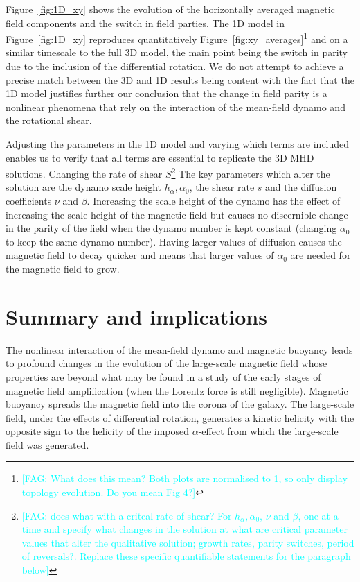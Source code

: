 \documentclass[fleqn,usenatbib]{mnras}
\newcommand{\fag}[1]{\textcolor{cyan}{[FAG: #1]}} %
\newcommand{\yq}[1]{\textcolor{PineGreen}{#1}} %
\begin{document}
Figure~\ref{fig:1D_xy} shows the evolution of the horizontally averaged
magnetic field components and the switch in field parties. The {1D} model in
Figure~\ref{fig:1D_xy} reproduces quantitatively
Figure~\ref{fig:xy_averages}\footnote{\fag{What does this mean? Both plots are
normalised to 1, so only display topology evolution. Do you mean Fig 4?}} and
on a similar timescale to the full {3D} model, the main point being the
switch in parity due to the inclusion of the differential rotation. We do not
attempt to achieve a precise match between the {3D} and {1D} results
being content with the fact that the {1D} model justifies further our
conclusion that the change in field parity is a nonlinear phenomena that rely
on the interaction of the mean-field dynamo and the rotational shear.

{Adjusting the parameters in the 1D model and varying which terms are
included enables us to verify that all terms are essential to replicate the 3D
MHD solutions.  Changing the rate of shear $S$\footnote{\fag{does what with a critcal
rate of shear? For $h_\alpha, \alpha_0$, $\nu$ and $\beta$, one at a time
and specify what changes in the solution at what are critical parameter values
that alter the qualitative solution; growth rates, parity switches, period of
reversals?. Replace these specific quantifiable statements for the paragraph
below}} \yq{The key parameters which alter the solution are the dynamo scale height
$h_\alpha, \alpha_0$, the shear rate $s$ and the diffusion coefficients $\nu$
and $\beta$. Increasing the scale height of the dynamo has the effect of
increasing the scale height of the magnetic field but causes no discernible
change in the parity of the field when the dynamo number is kept constant
(changing $\alpha_0$ to keep the same dynamo number). Having larger values of
diffusion causes the magnetic field to decay quicker and means that larger
values of $\alpha_0$ are needed for the magnetic field to grow.}

\section{Summary and implications}\label{sec:Summary}

The nonlinear interaction of the mean-field dynamo and magnetic buoyancy leads
to profound changes in the evolution of the large-scale magnetic field whose
properties are beyond what may be found in a study of the early stages of
magnetic field amplification (when the Lorentz force is still negligible).
Magnetic buoyancy spreads the magnetic field into the corona of the galaxy.
{The} large-scale field{,} under the effects of differential
rotation{,} generates a kinetic helicity with the opposite sign to the
helicity of the imposed $\alpha$-effect from which the large-scale field was
generated.

}
\end{document}
